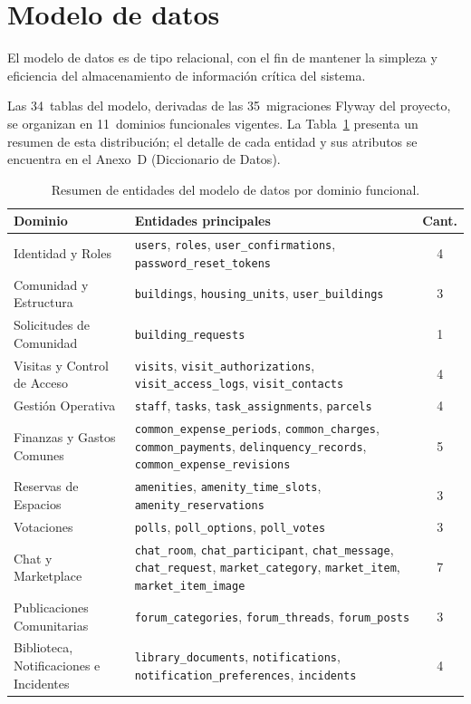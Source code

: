\section{Modelo de datos}

El modelo de datos es de tipo relacional, con el fin de mantener la simpleza y eficiencia del almacenamiento de información crítica del sistema.

Las 34~tablas del modelo, derivadas de las 35~migraciones Flyway del proyecto, se organizan en 11~dominios funcionales vigentes. La Tabla~\ref{tab:resumen-dominios} presenta un resumen de esta distribución; el detalle de cada entidad y sus atributos se encuentra en el Anexo~D (Diccionario de Datos).

\begin{table}[H]
\centering
\small
\begin{tabular}{|p{}|p{}|c|}
\hline
\textbf{Dominio} & \textbf{Entidades principales} & \textbf{Cant.} \\ \hline
Identidad y Roles & \texttt{users}, \texttt{roles}, \texttt{user\_confirmations}, \texttt{password\_reset\_tokens} & 4 \\ \hline
Comunidad y Estructura & \texttt{buildings}, \texttt{housing\_units}, \texttt{user\_buildings} & 3 \\ \hline
Solicitudes de Comunidad & \texttt{building\_requests} & 1 \\ \hline
Visitas y Control de Acceso & \texttt{visits}, \texttt{visit\_authorizations}, \texttt{visit\_access\_logs}, \texttt{visit\_contacts} & 4 \\ \hline
Gestión Operativa & \texttt{staff}, \texttt{tasks}, \texttt{task\_assignments}, \texttt{parcels} & 4 \\ \hline
Finanzas y Gastos Comunes & \texttt{common\_expense\_periods}, \texttt{common\_charges}, \texttt{common\_payments}, \texttt{delinquency\_records}, \texttt{common\_expense\_revisions} & 5 \\ \hline
Reservas de Espacios & \texttt{amenities}, \texttt{amenity\_time\_slots}, \texttt{amenity\_reservations} & 3 \\ \hline
Votaciones & \texttt{polls}, \texttt{poll\_options}, \texttt{poll\_votes} & 3 \\ \hline
Chat y Marketplace & \texttt{chat\_room}, \texttt{chat\_participant}, \texttt{chat\_message}, \texttt{chat\_request}, \texttt{market\_category}, \texttt{market\_item}, \texttt{market\_item\_image} & 7 \\ \hline
Publicaciones Comunitarias & \texttt{forum\_categories}, \texttt{forum\_threads}, \texttt{forum\_posts} & 3 \\ \hline
Biblioteca, Notificaciones e Incidentes & \texttt{library\_documents}, \texttt{notifications}, \texttt{notification\_preferences}, \texttt{incidents} & 4 \\ \hline
\end{tabular}
\caption{Resumen de entidades del modelo de datos por dominio funcional.}
\label{tab:resumen-dominios}
\end{table}

